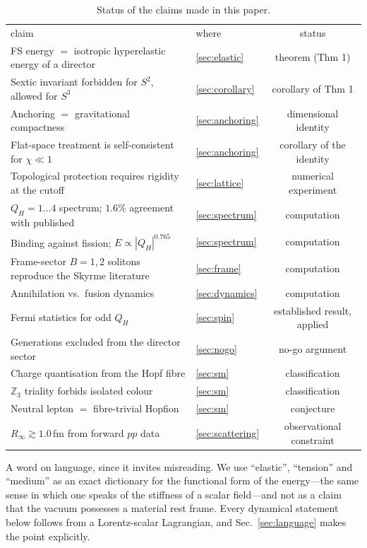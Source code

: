 \documentclass[aps,prd,preprint,nofootinbib,longbibliography]{revtex4-2}
\newcommand{\Qh}{Q_H}
\begin{document}
\begin{table}[htbp]
\caption{Status of the claims made in this paper.}
\label{tab:status}
\begin{ruledtabular}
\begin{tabular}{llc}
claim & where & status \\
\colrule
FS energy $=$ isotropic hyperelastic energy of a director & \ref{sec:elastic} & theorem (Thm 1) \\
Sextic invariant forbidden for $S^2$, allowed for $S^3$ & \ref{sec:corollary} & corollary of Thm 1 \\
Anchoring $=$ gravitational compactness & \ref{sec:anchoring} & dimensional identity \\
Flat-space treatment is self-consistent for $\chi\ll1$ & \ref{sec:anchoring} & corollary of the identity \\
Topological protection requires rigidity at the cutoff & \ref{sec:lattice} & numerical experiment \\
$\Qh=1\ldots4$ spectrum; $1.6\%$ agreement with published & \ref{sec:spectrum} & computation \\
Binding against fission; $E\propto|\Qh|^{0.765}$ & \ref{sec:spectrum} & computation \\
Frame-sector $B=1,2$ solitons reproduce the Skyrme literature & \ref{sec:frame} & computation \\
Annihilation vs.\ fusion dynamics & \ref{sec:dynamics} & computation \\
Fermi statistics for odd $\Qh$ & \ref{sec:spin} & established result, applied \\
Generations excluded from the director sector & \ref{sec:nogo} & no-go argument \\
Charge quantisation from the Hopf fibre & \ref{sec:sm} & classification \\
$\mathbb{Z}_3$ triality forbids isolated colour & \ref{sec:sm} & classification \\
Neutral lepton $=$ fibre-trivial Hopfion & \ref{sec:sm} & conjecture \\
$R_\infty\gtrsim1.0\,$fm from forward $pp$ data & \ref{sec:scattering} & observational constraint \\
\end{tabular}
\end{ruledtabular}
\end{table}

A word on language, since it invites misreading. We use ``elastic'', ``tension''
and ``medium'' as an exact dictionary for the functional form of the
energy---the same sense in which one speaks of the stiffness of a scalar
field---and not as a claim that the vacuum possesses a material rest frame. Every
dynamical statement below follows from a Lorentz-scalar Lagrangian, and
Sec.~\ref{sec:language} makes the point explicitly.
\end{document}
